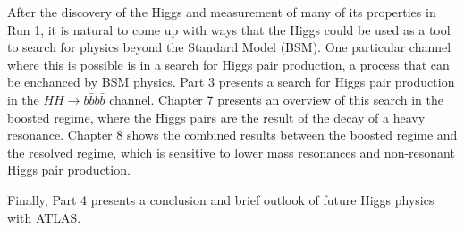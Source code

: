 After the discovery of the Higgs and measurement of many of its properties in Run 1, it is natural to come up with ways that the Higgs could be used as a tool to search for physics beyond the Standard Model (BSM). One particular channel where this is possible is in a search for Higgs pair production, a process that can be enchanced by BSM physics. Part 3 presents a search for Higgs pair production in the $HH \to b\bar{b} b\bar{b}$ channel. Chapter 7 presents an overview of this search in the boosted regime, where the Higgs pairs are the result of the decay of a heavy resonance. Chapter 8 shows the combined results between the boosted regime and the resolved regime, which is sensitive to lower mass resonances and non-resonant Higgs pair production. 

Finally, Part 4 presents a conclusion and brief outlook of future Higgs physics with ATLAS.
